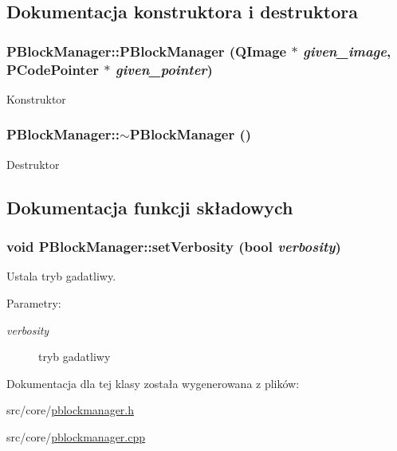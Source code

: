 \subsection{Dokumentacja konstruktora i destruktora}
\hypertarget{classPBlockManager_f5a95fca85a31c0257b38b57cbb3378a}{
\subsubsection[{PBlockManager}]{\setlength{\rightskip}{0pt plus 5cm}PBlockManager::PBlockManager (QImage $\ast$ {\em given\_\-image}, \/  {\bf PCodePointer} $\ast$ {\em given\_\-pointer})}}
\label{classPBlockManager_f5a95fca85a31c0257b38b57cbb3378a}


Konstruktor \hypertarget{classPBlockManager_52d7abb7f858625e9e014fb555f571a6}{
\subsubsection[{$\sim$PBlockManager}]{\setlength{\rightskip}{0pt plus 5cm}PBlockManager::$\sim$PBlockManager ()}}
\label{classPBlockManager_52d7abb7f858625e9e014fb555f571a6}


Destruktor 

\subsection{Dokumentacja funkcji składowych}
\hypertarget{classPBlockManager_926e182e360300d6524fbb01fb90866b}{
\subsubsection[{setVerbosity}]{\setlength{\rightskip}{0pt plus 5cm}void PBlockManager::setVerbosity (bool {\em verbosity})}}
\label{classPBlockManager_926e182e360300d6524fbb01fb90866b}


Ustala tryb gadatliwy. \begin{Desc}
\item[Parametry:]
\begin{description}
\item[{\em verbosity}]tryb gadatliwy \end{description}
\end{Desc}


Dokumentacja dla tej klasy została wygenerowana z plików:\begin{CompactItemize}
\item 
src/core/\hyperlink{pblockmanager_8h}{pblockmanager.h}\item 
src/core/\hyperlink{pblockmanager_8cpp}{pblockmanager.cpp}\end{CompactItemize}
